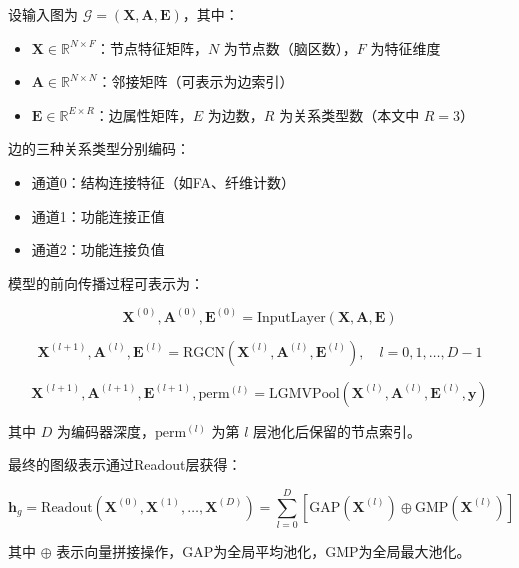 设输入图为 $\mathcal{G} = (\mathbf{X}, \mathbf{A}, \mathbf{E})$，其中：
\begin{itemize}
    \item $\mathbf{X} \in \mathbb{R}^{N \times F}$：节点特征矩阵，$N$ 为节点数（脑区数），$F$ 为特征维度
    \item $\mathbf{A} \in \mathbb{R}^{N \times N}$：邻接矩阵（可表示为边索引）
    \item $\mathbf{E} \in \mathbb{R}^{E \times R}$：边属性矩阵，$E$ 为边数，$R$ 为关系类型数（本文中 $R=3$）
\end{itemize}

边的三种关系类型分别编码：
\begin{itemize}
    \item 通道0：结构连接特征（如FA、纤维计数）
    \item 通道1：功能连接正值
    \item 通道2：功能连接负值
\end{itemize}

模型的前向传播过程可表示为：

\begin{equation}
\mathbf{X}^{(0)}, \mathbf{A}^{(0)}, \mathbf{E}^{(0)} = \text{InputLayer}(\mathbf{X}, \mathbf{A}, \mathbf{E})
\end{equation}

\begin{equation}
\mathbf{X}^{(l+1)}, \mathbf{A}^{(l)}, \mathbf{E}^{(l)} = \text{RGCN}\left(\mathbf{X}^{(l)}, \mathbf{A}^{(l)}, \mathbf{E}^{(l)}\right), \quad l = 0, 1, \ldots, D-1
\end{equation}

\begin{equation}
\mathbf{X}^{(l+1)}, \mathbf{A}^{(l+1)}, \mathbf{E}^{(l+1)}, \text{perm}^{(l)} = \text{LGMVPool}\left(\mathbf{X}^{(l)}, \mathbf{A}^{(l)}, \mathbf{E}^{(l)}, \mathbf{y}\right)
\end{equation}

其中 $D$ 为编码器深度，$\text{perm}^{(l)}$ 为第 $l$ 层池化后保留的节点索引。

最终的图级表示通过Readout层获得：

\begin{equation}
\mathbf{h}_g = \text{Readout}(\mathbf{X}^{(0)}, \mathbf{X}^{(1)}, \ldots, \mathbf{X}^{(D)}) = \sum_{l=0}^{D} \left[ \text{GAP}(\mathbf{X}^{(l)}) \oplus \text{GMP}(\mathbf{X}^{(l)}) \right]
\end{equation}

其中 $\oplus$ 表示向量拼接操作，GAP为全局平均池化，GMP为全局最大池化。

